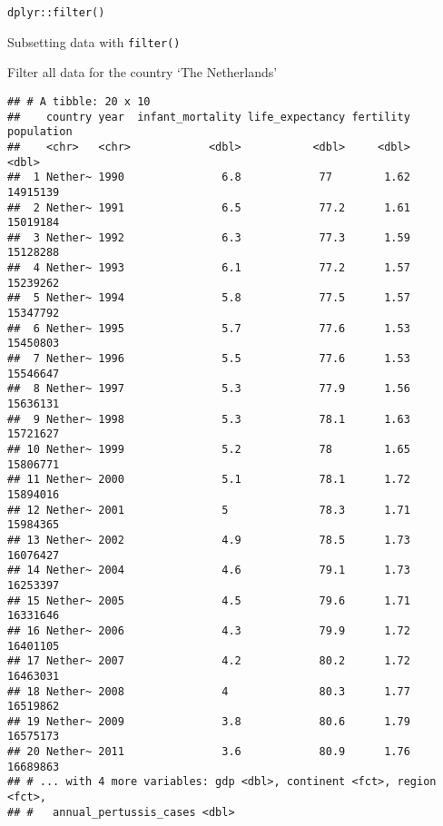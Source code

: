 \documentclass[ignorenonframetext,]{beamer}
\newenvironment{Shaded}{\begin{snugshade}}{\end{snugshade}}
\newcommand{\CommentTok}[1]{\textcolor[rgb]{0.56,0.35,0.01}{\textit{#1}}}
\newcommand{\KeywordTok}[1]{\textcolor[rgb]{0.13,0.29,0.53}{\textbf{#1}}}
\newcommand{\NormalTok}[1]{#1}
\newcommand{\OperatorTok}[1]{\textcolor[rgb]{0.81,0.36,0.00}{\textbf{#1}}}
\newcommand{\StringTok}[1]{\textcolor[rgb]{0.31,0.60,0.02}{#1}}
\begin{document}
\begin{frame}[fragile]{\texttt{dplyr::filter()}}
\protect\hypertarget{dplyrfilter}{}

\begin{block}{Subsetting data with \texttt{filter()}}

Filter all data for the country `The Netherlands'

\begin{Shaded}
\end{Shaded}

\begin{verbatim}
## # A tibble: 20 x 10
##    country year  infant_mortality life_expectancy fertility population
##    <chr>   <chr>            <dbl>           <dbl>     <dbl>      <dbl>
##  1 Nether~ 1990               6.8            77        1.62   14915139
##  2 Nether~ 1991               6.5            77.2      1.61   15019184
##  3 Nether~ 1992               6.3            77.3      1.59   15128288
##  4 Nether~ 1993               6.1            77.2      1.57   15239262
##  5 Nether~ 1994               5.8            77.5      1.57   15347792
##  6 Nether~ 1995               5.7            77.6      1.53   15450803
##  7 Nether~ 1996               5.5            77.6      1.53   15546647
##  8 Nether~ 1997               5.3            77.9      1.56   15636131
##  9 Nether~ 1998               5.3            78.1      1.63   15721627
## 10 Nether~ 1999               5.2            78        1.65   15806771
## 11 Nether~ 2000               5.1            78.1      1.72   15894016
## 12 Nether~ 2001               5              78.3      1.71   15984365
## 13 Nether~ 2002               4.9            78.5      1.73   16076427
## 14 Nether~ 2004               4.6            79.1      1.73   16253397
## 15 Nether~ 2005               4.5            79.6      1.71   16331646
## 16 Nether~ 2006               4.3            79.9      1.72   16401105
## 17 Nether~ 2007               4.2            80.2      1.72   16463031
## 18 Nether~ 2008               4              80.3      1.77   16519862
## 19 Nether~ 2009               3.8            80.6      1.79   16575173
## 20 Nether~ 2011               3.6            80.9      1.76   16689863
## # ... with 4 more variables: gdp <dbl>, continent <fct>, region <fct>,
## #   annual_pertussis_cases <dbl>
\end{verbatim}

\end{block}

\end{frame}
\end{document}
